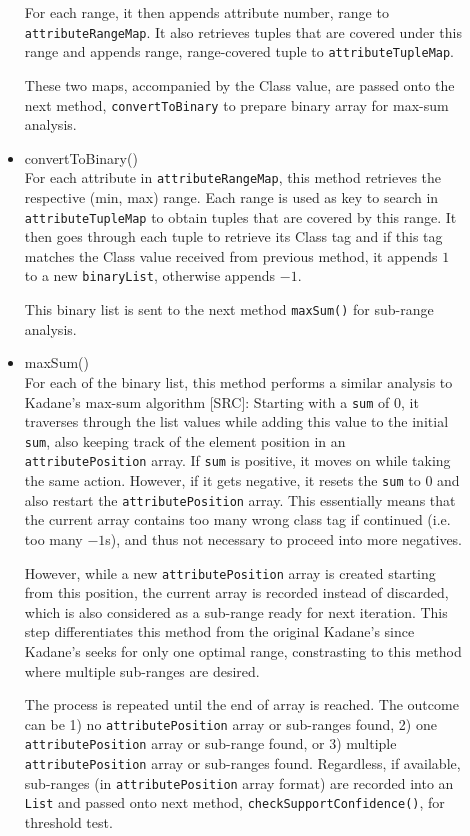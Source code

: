 \begin{description}
\begin{itemize}
	For each range, it then appends {attribute number, range} to \texttt{attributeRangeMap}. It also retrieves tuples that are covered under this range and appends {range, range-covered tuple} to \texttt{attributeTupleMap}. 
	
	These two maps, accompanied by the Class value, are passed onto the next method, \texttt{convertToBinary} to prepare binary array for max-sum analysis.
	
	\item{convertToBinary()} \\
	For each attribute in \texttt{attributeRangeMap}, this method retrieves the respective (min, max) range. Each range is used as key to search in \texttt{attributeTupleMap} to obtain tuples that are covered by this range. It then goes through each tuple to retrieve its Class tag and if this tag matches the Class value received from previous method, it appends $1$ to a new \texttt{binaryList}, otherwise appends $-1$. 
	
	This binary list is sent to the next method \texttt{maxSum()} for sub-range analysis.
	
	\item{maxSum()} \\
	For each of the binary list, this method performs a similar analysis to Kadane's max-sum algorithm [SRC]: Starting with a \texttt{sum} of $0$, it traverses through the list values while adding this value to the initial \texttt{sum}, also keeping track of the element position in an \texttt{attributePosition} array. If \texttt{sum} is positive, it moves on while taking the same action. However, if it gets negative, it resets the \texttt{sum} to $0$ and also restart the \texttt{attributePosition} array. This essentially means that the current array contains too many wrong class tag if continued (i.e. too many $-1$s), and thus not necessary to proceed into more negatives. 
	
	However, while a new \texttt{attributePosition} array is created starting from this position, the current array is recorded instead of discarded, which is also considered as a sub-range ready for next iteration. This step differentiates this method from the original Kadane's since Kadane's seeks for only one optimal range, constrasting to this method where multiple sub-ranges are desired.
	
	The process is repeated until the end of array is reached. The outcome can be 1) no \texttt{attributePosition} array or sub-ranges found, 2) one \texttt{attributePosition} array or sub-range found, or 3) multiple \texttt{attributePosition} array or sub-ranges found. Regardless, if available, sub-ranges (in \texttt{attributePosition} array format) are recorded into an \texttt{List} and passed onto next method, \texttt{checkSupportConfidence()}, for threshold test. 
	

\end{itemize}
\end{description}
